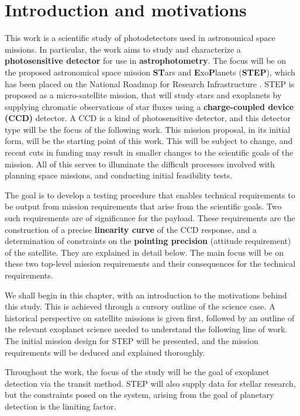 \documentclass[../main.tex]{subfiles}
\begin{document}
	
	\chapter{Introduction and motivations}
	
	This work is a scientific study of photodetectors used in astronomical space missions. In particular, the work aims to study and characterize a \textbf{photosensitive detector} for use in \textbf{astrophotometry}. The focus will be on the proposed astronomical space mission \textbf{ST}ars and \textbf{E}xo\textbf{P}lanets (\textbf{STEP}), which has been placed on the National Roadmap for Research Infrastructure \cite{stepprodex}. STEP is proposed as a micro-satellite mission, that will study stars and exoplanets by supplying chromatic observations of star fluxes using a \textbf{charge-coupled device (CCD)} detector. A CCD is a kind of photosensitive detector, and this detector type will be the focus of the following work. This mission proposal, in its initial form, will be the starting point of this work. This will be subject to change, and recent cuts in funding may result in smaller changes to the scientific goals of the mission. All of this serves to illuminate the difficult processes involved with planning space missions, and conducting initial feasibility tests. 
	
	The goal is to develop a testing procedure that enables technical requirements to be output from mission requirements that arise from the scientific goals. Two such requirements are of significance for the payload. These requirements are the construction of a precise \textbf{linearity curve} of the CCD response, and a determination of constraints on the \textbf{pointing precision} (attitude requirement) of the satellite. They are explained in detail below. The main focus will be on these two top-level mission requirements and their consequences for the technical requirements. 
	
	We shall begin in this chapter, with an introduction to the motivations behind this study. This is achieved through a cursory outline of the science case. A historical perspective on satellite missions is given first, followed by an outline of the relevant exoplanet science needed to understand the following line of work. The initial mission design for STEP will be presented, and the mission requirements will be deduced and explained thoroughly. 
	
	Throughout the work, the focus of the study will be the goal of exoplanet detection via the transit method.  STEP will also supply data for stellar research, but the constraints posed on the system, arising from the goal of planetary detection is the limiting factor.
\end{document}
